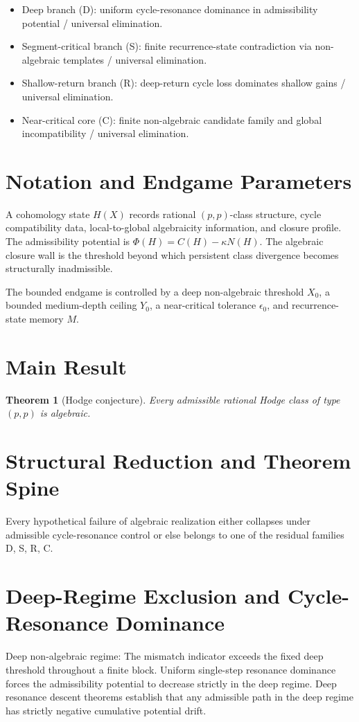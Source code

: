 \documentclass[11pt,a4paper]{article}
\newtheorem{theorem}{Theorem}
\begin{document}
\begin{itemize}
    \item Deep branch (D): uniform cycle-resonance dominance in admissibility potential / universal elimination.
    \item Segment-critical branch (S): finite recurrence-state contradiction via non-algebraic templates / universal elimination.
    \item Shallow-return branch (R): deep-return cycle loss dominates shallow gains / universal elimination.
    \item Near-critical core (C): finite non-algebraic candidate family and global incompatibility / universal elimination.
\end{itemize}

\section{Notation and Endgame Parameters}
A cohomology state \(H(X)\) records rational \((p,p)\)-class structure, cycle compatibility data, local-to-global algebraicity information, and closure profile. The admissibility potential is \(\Phi(H) = C(H) - \kappa N(H)\). The algebraic closure wall is the threshold beyond which persistent class divergence becomes structurally inadmissible.

The bounded endgame is controlled by a deep non-algebraic threshold \(X_0\), a bounded medium-depth ceiling \(Y_0\), a near-critical tolerance \(\epsilon_0\), and recurrence-state memory \(M\).

\section{Main Result}
\begin{theorem}[Hodge conjecture]
Every admissible rational Hodge class of type \((p,p)\) is algebraic.
\end{theorem}

\section{Structural Reduction and Theorem Spine}
Every hypothetical failure of algebraic realization either collapses under admissible cycle-resonance control or else belongs to one of the residual families D, S, R, C.

\section{Deep-Regime Exclusion and Cycle-Resonance Dominance}
Deep non-algebraic regime: The mismatch indicator exceeds the fixed deep threshold throughout a finite block. Uniform single-step resonance dominance forces the admissibility potential to decrease strictly in the deep regime. Deep resonance descent theorems establish that any admissible path in the deep regime has strictly negative cumulative potential drift.
\end{document}

